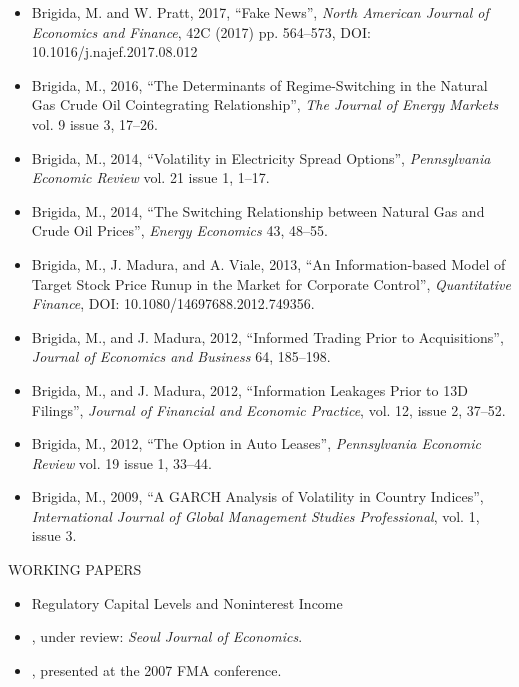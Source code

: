 \documentclass[9pt]{article}
\begin{document}
\begin{itemize}[noitemsep, nolistsep]
\item Brigida, M. and W. Pratt, 2017, ``Fake News'', {\it North American Journal of Economics and Finance\/}, 42C (2017) pp. 564--573, DOI: 10.1016/j.najef.2017.08.012
\item Brigida, M., 2016, ``The Determinants of Regime-Switching in the Natural Gas Crude Oil Cointegrating Relationship'', {\it The Journal of Energy Markets} vol. 9 issue 3, 17--26.
\item Brigida, M., 2014, ``Volatility in Electricity Spread Options'', {\it Pennsylvania Economic Review} vol. 21 issue 1, 1--17.
\item Brigida, M., 2014, ``The Switching Relationship between Natural Gas and Crude Oil Prices'', {\it Energy Economics\/} 43, 48--55.  
\item Brigida, M., J. Madura, and A. Viale, 2013, ``An Information-based Model of Target Stock Price Runup in the Market for Corporate Control'', {\it Quantitative Finance\/}, DOI: 10.1080/14697688.2012.749356.
\item Brigida, M., and J. Madura, 2012, ``Informed Trading Prior to Acquisitions'', {\it Journal of Economics and Business} 64, 185--198.
\item Brigida, M., and J. Madura, 2012, ``Information Leakages Prior to 13D Filings'', {\it Journal of Financial and Economic Practice}, vol. 12, issue 2, 37--52.
\item Brigida, M., 2012, ``The Option in Auto Leases'', {\it Pennsylvania Economic Review} vol. 19 issue 1, 33--44.
\item Brigida, M., 2009, ``A GARCH Analysis of Volatility in Country Indices'', {\it International Journal of Global Management Studies Professional}, vol. 1, issue 3.
\end{itemize}
\vspace{10pt}
WORKING PAPERS
\begin{itemize}[noitemsep, nolistsep]
\item Regulatory Capital Levels and Noninterest Income
\item \href{http://complete-markets.com/wp-content/uploads/2014/07/Performance_measures_June_2014.pdf}{\color{Blue}{How Consistent are the Judges of Portfolio Performance?}}, under review: {\it Seoul Journal of Economics}.
\item \href{https://docs.google.com/file/d/0B46EsGCAlLnPdmxsT3ZtVGk5Wkk/edit?usp=sharing}{\color{Blue}{Almost Stochastic Dominance: A Penchant for Risk}}, presented at the 2007 FMA conference.
\end{itemize}
\end{document}
